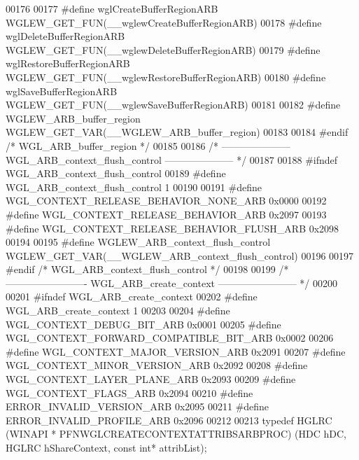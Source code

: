 \begin{DoxyCode}
00176 
00177 \textcolor{preprocessor}{#define wglCreateBufferRegionARB WGLEW\_GET\_FUN(\_\_wglewCreateBufferRegionARB)}
00178 \textcolor{preprocessor}{#define wglDeleteBufferRegionARB WGLEW\_GET\_FUN(\_\_wglewDeleteBufferRegionARB)}
00179 \textcolor{preprocessor}{#define wglRestoreBufferRegionARB WGLEW\_GET\_FUN(\_\_wglewRestoreBufferRegionARB)}
00180 \textcolor{preprocessor}{#define wglSaveBufferRegionARB WGLEW\_GET\_FUN(\_\_wglewSaveBufferRegionARB)}
00181 
00182 \textcolor{preprocessor}{#define WGLEW\_ARB\_buffer\_region WGLEW\_GET\_VAR(\_\_WGLEW\_ARB\_buffer\_region)}
00183 
00184 \textcolor{preprocessor}{#endif }\textcolor{comment}{/* WGL\_ARB\_buffer\_region */}\textcolor{preprocessor}{}
00185 
00186 \textcolor{comment}{/* --------------------- WGL\_ARB\_context\_flush\_control --------------------- */}
00187 
00188 \textcolor{preprocessor}{#ifndef WGL\_ARB\_context\_flush\_control}
00189 \textcolor{preprocessor}{#define WGL\_ARB\_context\_flush\_control 1}
00190 
00191 \textcolor{preprocessor}{#define WGL\_CONTEXT\_RELEASE\_BEHAVIOR\_NONE\_ARB 0x0000}
00192 \textcolor{preprocessor}{#define WGL\_CONTEXT\_RELEASE\_BEHAVIOR\_ARB 0x2097}
00193 \textcolor{preprocessor}{#define WGL\_CONTEXT\_RELEASE\_BEHAVIOR\_FLUSH\_ARB 0x2098}
00194 
00195 \textcolor{preprocessor}{#define WGLEW\_ARB\_context\_flush\_control WGLEW\_GET\_VAR(\_\_WGLEW\_ARB\_context\_flush\_control)}
00196 
00197 \textcolor{preprocessor}{#endif }\textcolor{comment}{/* WGL\_ARB\_context\_flush\_control */}\textcolor{preprocessor}{}
00198 
00199 \textcolor{comment}{/* ------------------------- WGL\_ARB\_create\_context ------------------------ */}
00200 
00201 \textcolor{preprocessor}{#ifndef WGL\_ARB\_create\_context}
00202 \textcolor{preprocessor}{#define WGL\_ARB\_create\_context 1}
00203 
00204 \textcolor{preprocessor}{#define WGL\_CONTEXT\_DEBUG\_BIT\_ARB 0x0001}
00205 \textcolor{preprocessor}{#define WGL\_CONTEXT\_FORWARD\_COMPATIBLE\_BIT\_ARB 0x0002}
00206 \textcolor{preprocessor}{#define WGL\_CONTEXT\_MAJOR\_VERSION\_ARB 0x2091}
00207 \textcolor{preprocessor}{#define WGL\_CONTEXT\_MINOR\_VERSION\_ARB 0x2092}
00208 \textcolor{preprocessor}{#define WGL\_CONTEXT\_LAYER\_PLANE\_ARB 0x2093}
00209 \textcolor{preprocessor}{#define WGL\_CONTEXT\_FLAGS\_ARB 0x2094}
00210 \textcolor{preprocessor}{#define ERROR\_INVALID\_VERSION\_ARB 0x2095}
00211 \textcolor{preprocessor}{#define ERROR\_INVALID\_PROFILE\_ARB 0x2096}
00212 
00213 \textcolor{keyword}{typedef} HGLRC (WINAPI * PFNWGLCREATECONTEXTATTRIBSARBPROC) (HDC hDC, HGLRC 
      hShareContext, \textcolor{keyword}{const} \textcolor{keywordtype}{int}* attribList);

\end{DoxyCode}
